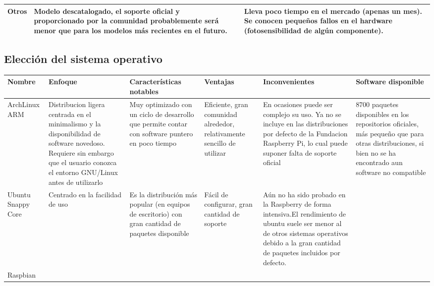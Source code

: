 \begin{landscape}
\begin{table}[h]
\begin{tabular}{|p{3cm}|p{6cm}|p{6cm}|p{6cm}|}
Otros & Modelo descatalogado, el soporte oficial y proporcionado por la comunidad probablemente será menor que para los modelos más recientes en el futuro. &  & Lleva poco tiempo en el mercado (apenas un mes). Se conocen pequeños fallos en el hardware (fotosensibilidad de algún componente).\\ \hline

\end{tabular}
\end{table}
\end{landscape}



\begin{landscape}
\subsection{Elección del sistema operativo}
\label{os:evaluation}
\begin{table}[h]
\begin{tabular}{|p{2cm}|p{4cm}|p{5cm}|p{3cm}|p{4cm}|p{4cm}|}
\hline
Nombre & Enfoque & Características notables & Ventajas & Inconvenientes & Software disponible\\ \hline
ArchLinux ARM & Distribucion ligera centrada en el minimalismo y la disponibilidad de software novedoso. Requiere sin embargo que el usuario conozca el entorno GNU/Linux antes de utilizarlo & Muy optimizado con un ciclo de desarrollo que permite contar con software puntero en poco tiempo & Eficiente, gran comunidad alrededor, relativamente sencillo de utilizar & En ocasiones puede ser complejo su uso. Ya no se incluye en las distribuciones por defecto de la Fundacion Raspberry Pi, lo cual puede suponer falta de soporte oficial & 8700 paquetes disponibles en los repositorios oficiales, más pequeño que para otras distribuciones, si bien no se ha encontrado aun software no compatible\\ \hline

Ubuntu Snappy Core & Centrado en la facilidad de uso & Es la distribución más popular (en equipos de escritorio) con gran cantidad de paquetes disponible & Fácil de configurar, gran cantidad de soporte & Aún no ha sido probado en la Raspberry de forma intensiva.El rendimiento de ubuntu suele ser menor al de otros sistemas operativos debido a la gran cantidad de paquetes incluidos por defecto. & \\ \hline 

Raspbian & & & & &\\ \hline
\end{tabular}
\end{table}
\end{landscape}

